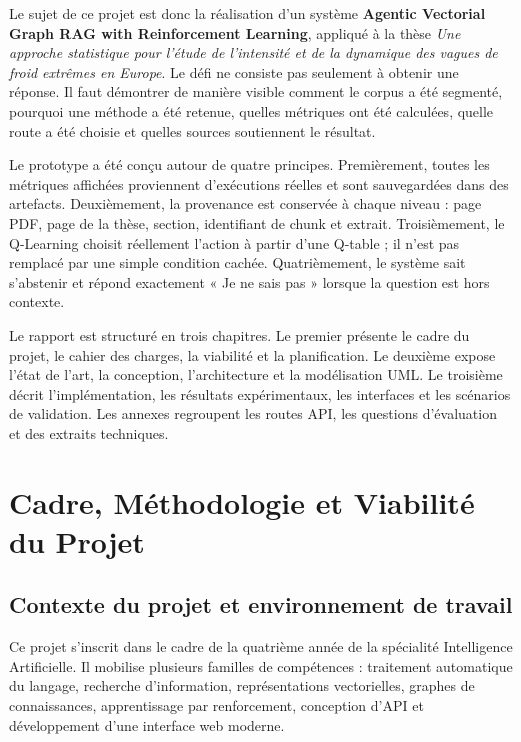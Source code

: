 \documentclass[12pt,a4paper,oneside]{report}
\begin{document}
Le sujet de ce projet est donc la réalisation d'un système \textbf{Agentic Vectorial Graph RAG with Reinforcement Learning}, appliqué à la thèse \textit{Une approche statistique pour l'étude de l'intensité et de la dynamique des vagues de froid extrêmes en Europe}. Le défi ne consiste pas seulement à obtenir une réponse. Il faut démontrer de manière visible comment le corpus a été segmenté, pourquoi une méthode a été retenue, quelles métriques ont été calculées, quelle route a été choisie et quelles sources soutiennent le résultat.

Le prototype a été conçu autour de quatre principes. Premièrement, toutes les métriques affichées proviennent d'exécutions réelles et sont sauvegardées dans des artefacts. Deuxièmement, la provenance est conservée à chaque niveau : page PDF, page de la thèse, section, identifiant de chunk et extrait. Troisièmement, le Q-Learning choisit réellement l'action à partir d'une Q-table ; il n'est pas remplacé par une simple condition cachée. Quatrièmement, le système sait s'abstenir et répond exactement « Je ne sais pas » lorsque la question est hors contexte.

Le rapport est structuré en trois chapitres. Le premier présente le cadre du projet, le cahier des charges, la viabilité et la planification. Le deuxième expose l'état de l'art, la conception, l'architecture et la modélisation UML. Le troisième décrit l'implémentation, les résultats expérimentaux, les interfaces et les scénarios de validation. Les annexes regroupent les routes API, les questions d'évaluation et des extraits techniques.

\chapter{Cadre, Méthodologie et Viabilité du Projet}

\section{Contexte du projet et environnement de travail}
Ce projet s'inscrit dans le cadre de la quatrième année de la spécialité Intelligence Artificielle. Il mobilise plusieurs familles de compétences : traitement automatique du langage, recherche d'information, représentations vectorielles, graphes de connaissances, apprentissage par renforcement, conception d'API et développement d'une interface web moderne.
\end{document}
